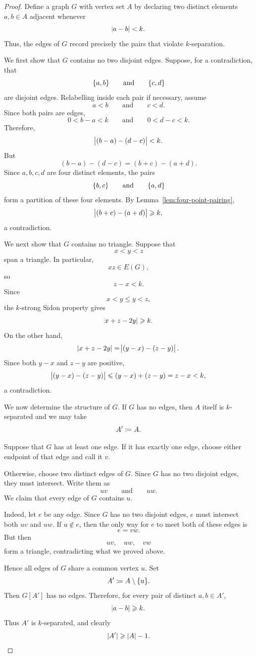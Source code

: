 \documentclass[reqno,a4paper,12pt]{amsart}
\begin{document}
\begin{proof}
    Define a graph \(G\) with vertex set \(A\) by declaring two distinct
    elements \(a,b\in A\) adjacent whenever
    \[
        \abs{a-b}<k.
    \]
    Thus, the edges of \(G\) record precisely the pairs that violate
    \(k\)-separation.

    We first show that \(G\) contains no two disjoint edges. Suppose,
    for a contradiction, that
    \[
        \lbrace a,b\rbrace
        \qquad\text{and}\qquad
        \lbrace c,d\rbrace
    \]
    are disjoint edges. Relabelling inside each pair if necessary,
    assume
    \[
        a<b
        \qquad\text{and}\qquad
        c<d.
    \]
    Since both pairs are edges,
    \[
        0<b-a<k
        \qquad\text{and}\qquad
        0<d-c<k.
    \]
    Therefore,
    \[
        \abs{(b-a)-(d-c)}<k.
    \]
    But
    \[
        (b-a)-(d-c)
        =
        (b+c)-(a+d).
    \]
    Since \(a,b,c,d\) are four distinct elements, the pairs
    \[
        \lbrace b,c\rbrace
        \qquad\text{and}\qquad
        \lbrace a,d\rbrace
    \]
    form a partition of these four elements. By
    Lemma~\ref{lem:four-point-pairing},
    \[
        \abs{(b+c)-(a+d)}
        \geqslant k,
    \]
    a contradiction.

    We next show that \(G\) contains no triangle. Suppose that
    \[
        x<y<z
    \]
    span a triangle. In particular,
    \[
        xz\in E(G),
    \]
    so
    \[
        z-x<k.
    \]
    Since
    \[
        x<y\leq y<z,
    \]
    the \(k\)-strong Sidon property gives
    \[
        \abs{x+z-2y}\geqslant k.
    \]
    On the other hand,
    \[
        \abs{x+z-2y}
        =
        \abs{(y-x)-(z-y)}.
    \]
    Since both \(y-x\) and \(z-y\) are positive,
    \[
        \abs{(y-x)-(z-y)}
        \leqslant
        (y-x)+(z-y)
        =
        z-x
        <
        k,
    \]
    a contradiction.

    We now determine the structure of \(G\).
    If \(G\) has no edges, then \(A\) itself is \(k\)-separated and we
    may take
    \[
        A'\mathrel{\coloneqq} A.
    \]

    Suppose that \(G\) has at least one edge. If it has exactly one
    edge, choose either endpoint of that edge and call it \(v\).

    Otherwise, choose two distinct edges of \(G\). Since \(G\) has no
    two disjoint edges, they must intersect. Write them as
    \[
        uv
        \qquad\text{and}\qquad
        uw.
    \]
    We claim that every edge of \(G\) contains \(u\).

    Indeed, let \(e\) be any edge. Since \(G\) has no two disjoint
    edges, \(e\) must intersect both \(uv\) and \(uw\). If \(u\notin e\),
    then the only way for \(e\) to meet both of these edges is
    \[
        e=vw.
    \]
    But then
    \[
        uv,\quad uw,\quad vw
    \]
    form a triangle, contradicting what we proved above.

    Hence all edges of \(G\) share a common vertex \(u\). Set
    \[
        A'\mathrel{\coloneqq} A\setminus\lbrace u\rbrace.
    \]
    Then \(G[A']\) has no edges. Therefore, for every pair of distinct
    \(a,b\in A'\),
    \[
        \abs{a-b}\geqslant k.
    \]
    Thus \(A'\) is \(k\)-separated, and clearly
    \[
        \lvert A'\rvert
        \geqslant
        \lvert A\rvert-1.
    \]
\end{proof}
\end{document}
